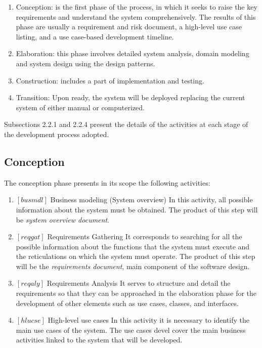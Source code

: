 \documentclass[11pt, twoside, a4paper]{book}
\begin{document}
				\begin{enumerate}
					\item Conception: is the first phase of the process, in which it seeks to raise the key requirements and understand the system comprehensively. The results of this phase are usually a requirement and risk document, a high-level use case listing, and a use case-based development timeline.
					\item Elaboration: this phase involves detailed system analysis, domain modeling and system design using the design patterns.
					\item Construction: includes a part of implementation and testing.
					\item Transition: Upon ready, the system will be deployed replacing the current system of either manual or computerized.
				\end{enumerate}
				
				Subsections 2.2.1 and 2.2.4 present the details of the activities at each stage of the development process adopted.
				
				\subsection{Conception}

					The conception phase presents in its scope the following activities:	
						
					\begin{enumerate}
						\item $[busmdl]$ Business modeling (System overview)
							In this activity, all possible information about the system must be obtained. The product of this step will be \emph{system overview document}.
						\item $[reqgat]$ Requirements Gathering
							It corresponds to searching for all the possible information about the functions that the system must execute and the reticulations on which the system must operate. The product of this step will be the \emph{requirements document}, main component of the software design.
						\item $[reqaly]$ Requirements Analysis
							It serves to structure and detail the requirements so that they can be approached in the elaboration phase for the development of other elements such as use cases, classes, and interfaces.
						\item $[hlucse]$ High-level use cases
							In this activity it is necessary to identify the main use cases of the system. The use cases devel cover the main business activities linked to the system that will be developed.
					\end{enumerate}
					
\end{document}
